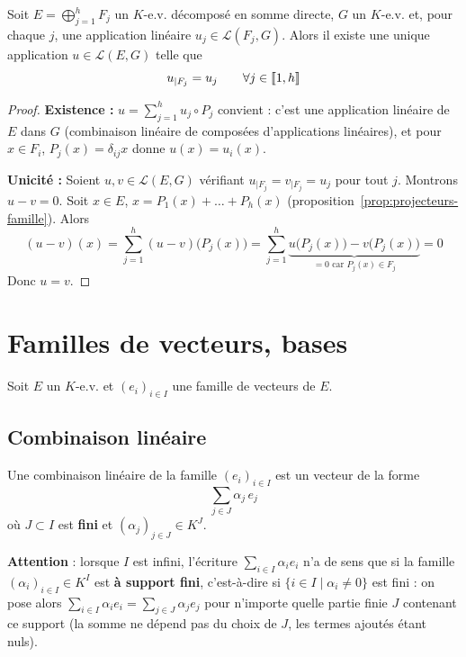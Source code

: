 \begin{prop}
\label{prop:recollement}
Soit $E=\displaystyle\bigoplus_{j=1}^{h} F_j$ un $K$-e.v. décomposé en somme directe, $G$ un $K$-e.v. et, pour chaque $j$, une application linéaire $u_j\in\mathcal{L}(F_j,G)$. Alors il existe une unique application $u\in\mathcal{L}(E,G)$ telle que
\[u_{|F_j} = u_j \qquad \forall j\in\llbracket 1,h \rrbracket\]
\end{prop}

\begin{proof}
\textbf{Existence :} $u=\displaystyle\sum_{j=1}^{h} u_j\circ P_j$ convient : c'est une application linéaire de $E$ dans $G$ (combinaison linéaire de composées d'applications linéaires), et pour $x\in F_i$, $P_j(x)=\delta_{ij}x$ donne $u(x)=u_i(x)$.

\textbf{Unicité :} Soient $u,v\in\mathcal{L}(E,G)$ vérifiant $u_{|F_j}=v_{|F_j}=u_j$ pour tout $j$. Montrons $u-v=0$. Soit $x\in E$, $x=P_1(x)+\dots+P_h(x)$ (proposition~\ref{prop:projecteurs-famille}). Alors
\[(u-v)(x) = \sum_{j=1}^{h} (u-v)\big(P_j(x)\big) = \sum_{j=1}^{h} \underbrace{u\big(P_j(x)\big) - v\big(P_j(x)\big)}_{=0 \text{ car } P_j(x)\in F_j} = 0\]
Donc $u=v$.
\end{proof}

\section{Familles de vecteurs, bases}

Soit $E$ un $K$-e.v. et $(e_i)_{i\in I}$ une famille de vecteurs de $E$.

\subsection{Combinaison linéaire}

\begin{defi}
Une combinaison linéaire de la famille $(e_i)_{i\in I}$ est un vecteur de la forme
\[\sum_{j\in J} \alpha_j\, e_j\]
où $J\subset I$ est \textbf{fini} et $(\alpha_j)_{j\in J}\in K^J$.

\medskip
\textbf{Attention} : lorsque $I$ est infini, l'écriture $\displaystyle\sum_{i\in I}\alpha_i e_i$ n'a de sens que si la famille $(\alpha_i)_{i\in I}\in K^I$ est \textbf{à support fini}, c'est-à-dire si $\{i\in I \mid \alpha_i\neq 0\}$ est fini : on pose alors $\displaystyle\sum_{i\in I}\alpha_i e_i = \sum_{j\in J}\alpha_j e_j$ pour n'importe quelle partie finie $J$ contenant ce support (la somme ne dépend pas du choix de $J$, les termes ajoutés étant nuls).
\end{defi}

